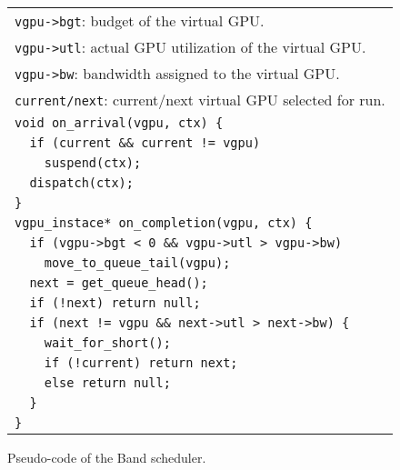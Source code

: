\begin{figure}[t]
 \begin{center}
  \begin{tabular}{l}
   \hline
   \hline
   {\small \verb|vgpu->bgt|: budget of the virtual GPU.}\\
   {\small \verb|vgpu->utl|: actual GPU utilization of the virtual GPU.}\\
   {\small \verb|vgpu->bw|: bandwidth assigned to the virtual
   GPU.}\\
   {\small \verb|current/next|: current/next virtual GPU selected for run.}\\
   \hline
   {\small \verb|void on_arrival(vgpu, ctx) {|}\\
   {\small \verb|  if (current && current != vgpu)|}\\
   {\small \verb|    suspend(ctx);|}\\
   {\small \verb|  dispatch(ctx);|}\\
   {\small \verb|}|}\\
   {\small \verb|vgpu_instace* on_completion(vgpu, ctx) {|}\\
   {\small \verb|  if (vgpu->bgt < 0 && vgpu->utl > vgpu->bw)|}\\
   {\small \verb|    move_to_queue_tail(vgpu);|}\\
   {\small \verb|  next = get_queue_head();|}\\
   {\small \verb|  if (!next) return null;|}\\
   {\small \verb|  if (next != vgpu && next->utl > next->bw) {|}\\
   {\small \verb|    wait_for_short();|}\\
   {\small \verb|    if (!current) return next;|}\\
   {\small \verb|    else return null;|}\\
   {\small \verb|  }|}\\
   {\small \verb|}|}\\
   \hline
  \end{tabular}
  \caption{Pseudo-code of the Band scheduler.}
  \label{fig:band}
 \end{center}
 \vspace{-2em}
\end{figure}

